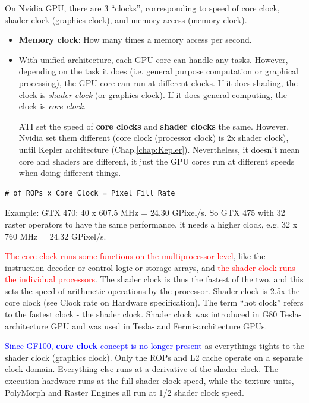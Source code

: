 On Nvidia GPU, there are 3 ``clocks'', corresponding to speed of core clock,
shader clock (graphics clock), and memory access (memory clock). 
\begin{itemize}
  \item {\bf Memory clock}: How many times a memory access per second.

\item With unified architecture, each GPU core can handle any tasks. However,
depending on the task it does (i.e. general purpose computation or graphical
processing), the GPU core can run at different clocks. If  it does shading, the
clock is {\it shader clock} (or graphics clock). If it does general-computing,
the clock is {\it core clock}.

ATI set the speed of {\bf core clocks} and {\bf shader clocks}  the same.
However, Nvidia set them different (core clock (processor clock) is 2x shader
clock), until Kepler architecture (Chap.\ref{chap:Kepler}). Nevertheless, it
doesn't mean core and shaders are different, it just the GPU cores run at
different speeds when doing different things.
\end{itemize}

\begin{verbatim}
# of ROPs x Core Clock = Pixel Fill Rate
\end{verbatim}
Example: GTX 470: 40 x 607.5 MHz = 24.30 GPixel/s. So GTX 475 with 32 raster
operators to have the same performance, it needs a higher clock, e.g. 32 x 760
MHz = 24.32 GPixel/s.


\begin{framed}
\textcolor{red}{The core clock runs some functions on the 
multiprocessor level},  like the instruction decoder or control logic or storage
arrays, and  \textcolor{red}{the shader clock runs the individual processors}. The
shader clock is thus the fastest of the two, and this sets the speed
of arithmetic operations by the processor. Shader clock is 2.5x the
core clock (see Clock rate on Hardware specification).
The term ``hot clock'' refers to the fastest clock - the shader clock. Shader
clock was introduced in G80 Tesla-architecture GPU and was used in Tesla- and
Fermi-architecture GPUs.
\end{framed}

\textcolor{blue}{Since GF100, {\bf core clock} concept is no longer present} as
everythings tights to the shader clock (graphics clock). Only the ROPs and L2
cache operate on a separate clock domain. Everything else runs at a derivative
of the shader clock. The execution hardware runs at the full shader clock speed,
while the texture units, PolyMorph and Raster Engines all run at 1/2 shader
clock speed.

